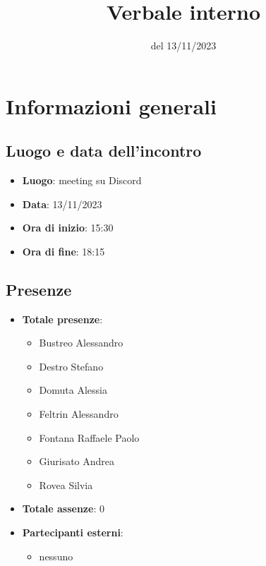 \documentclass[12pt]{article}
\title{Verbale interno}
\date{del 13/11/2023}
\begin{document}
	\makefirstpage
	
	
	\clearpage
	
	\tableofcontents
	\clearpage

    \section{Informazioni generali}
	
	\subsection{Luogo e data dell'incontro}
	
    	\begin{itemize}
    		\item \textbf{Luogo}: meeting su Discord
    		\item \textbf{Data}: 13/11/2023
    		\item \textbf{Ora di inizio}: 15:30
    		\item \textbf{Ora di fine}: 18:15
    	\end{itemize}
	
	\subsection{Presenze}
	
    	\begin{itemize}
    		\item \textbf{Totale presenze}:
    		\begin{itemize}
    			\item Bustreo Alessandro
    			\item Destro Stefano
    			\item Domuta Alessia 
    			\item Feltrin Alessandro 
    			\item Fontana Raffaele Paolo 
    			\item Giurisato Andrea 
    			\item Rovea Silvia
    		\end{itemize}
    		
    		\item \textbf{Totale assenze}: 0
    		
    		\item \textbf{Partecipanti esterni}:
    		\begin{itemize}
    			\item nessuno
    		\end{itemize}
    	\end{itemize}
\end{document}
